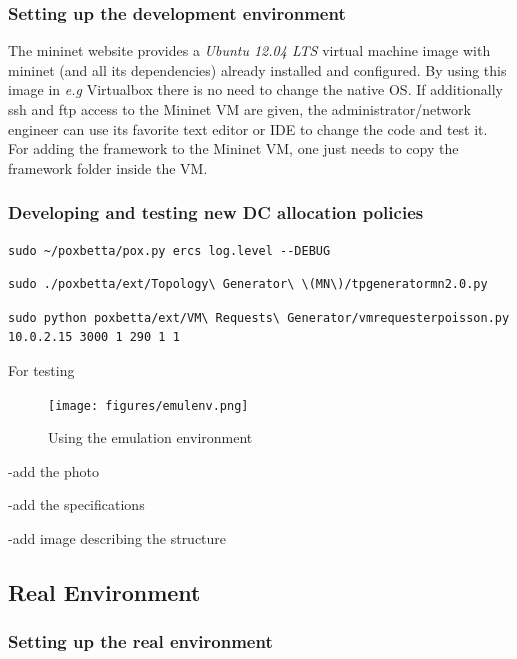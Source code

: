 \documentclass[12pt,english,oneside]{book}
\begin{document}
\subsubsection{Setting up the development environment}

The mininet website provides a \textit{Ubuntu 12.04 LTS} virtual machine image with mininet (and all its dependencies) already installed and configured. By using this image in \textit{e.g} Virtualbox\cite{vbox} there is no need to change the native OS. If additionally ssh and ftp access to the Mininet VM are given, the administrator/network engineer can use its favorite text editor or IDE to change the code and test it.
For adding the framework to the Mininet VM, one just needs to copy the framework folder inside the VM.

\subsubsection{Developing and testing new DC allocation policies}

\begin{verbatim}
sudo ~/poxbetta/pox.py ercs log.level --DEBUG
\end{verbatim}

\begin{verbatim}
sudo ./poxbetta/ext/Topology\ Generator\ \(MN\)/tpgeneratormn2.0.py 
\end{verbatim}

\begin{verbatim}
sudo python poxbetta/ext/VM\ Requests\ Generator/vmrequesterpoisson.py 10.0.2.15 3000 1 290 1 1
\end{verbatim}
For testing

\begin{figure}[h!tbp]
        \centering
        \texttt{[image: figures/emulenv.png]}
        \caption{Using the emulation environment}
        \label{fig:emulenv}
\end{figure}

-add the photo

-add the specifications

-add image describing the structure

\subsection{Real Environment}

\subsubsection{Setting up the real environment}
\end{document}
